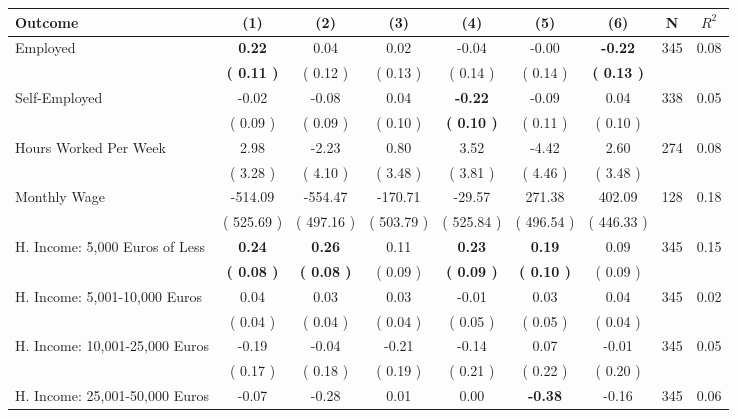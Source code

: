 \begin{tabular}{lcccccccc}
\toprule
 \textbf{Outcome} & \textbf{(1)} & \textbf{(2)} & \textbf{(3)} & \textbf{(4)} & \textbf{(5)} & \textbf{(6)} & \textbf{N} & \textbf{$ R^2$} \\
\midrule
Employed & \textbf{     0.22} &      0.04 &      0.02 &     -0.04 &     -0.00 & \textbf{    -0.22} & 345 &       0.08 \\ 
 & \textbf{(     0.11 )} & (     0.12 ) & (     0.13 ) & (     0.14 ) & (     0.14 ) & \textbf{(     0.13 )} & \\
Self-Employed &     -0.02 &     -0.08 &      0.04 & \textbf{    -0.22} &     -0.09 &      0.04 & 338 &       0.05 \\ 
 & (     0.09 ) & (     0.09 ) & (     0.10 ) & \textbf{(     0.10 )} & (     0.11 ) & (     0.10 ) & \\
Hours Worked Per Week &      2.98 &     -2.23 &      0.80 &      3.52 &     -4.42 &      2.60 & 274 &       0.08 \\ 
 & (     3.28 ) & (     4.10 ) & (     3.48 ) & (     3.81 ) & (     4.46 ) & (     3.48 ) & \\
Monthly Wage &   -514.09 &   -554.47 &   -170.71 &    -29.57 &    271.38 &    402.09 & 128 &       0.18 \\ 
 & (   525.69 ) & (   497.16 ) & (   503.79 ) & (   525.84 ) & (   496.54 ) & (   446.33 ) & \\
H. Income: 5,000 Euros of Less & \textbf{     0.24} & \textbf{     0.26} &      0.11 & \textbf{     0.23} & \textbf{     0.19} &      0.09 & 345 &       0.15 \\ 
 & \textbf{(     0.08 )} & \textbf{(     0.08 )} & (     0.09 ) & \textbf{(     0.09 )} & \textbf{(     0.10 )} & (     0.09 ) & \\
H. Income: 5,001-10,000 Euros &      0.04 &      0.03 &      0.03 &     -0.01 &      0.03 &      0.04 & 345 &       0.02 \\ 
 & (     0.04 ) & (     0.04 ) & (     0.04 ) & (     0.05 ) & (     0.05 ) & (     0.04 ) & \\
H. Income: 10,001-25,000 Euros &     -0.19 &     -0.04 &     -0.21 &     -0.14 &      0.07 &     -0.01 & 345 &       0.05 \\ 
 & (     0.17 ) & (     0.18 ) & (     0.19 ) & (     0.21 ) & (     0.22 ) & (     0.20 ) & \\
H. Income: 25,001-50,000 Euros &     -0.07 &     -0.28 &      0.01 &      0.00 & \textbf{    -0.38} &     -0.16 & 345 &       0.06 \\ 

\end{tabular}

